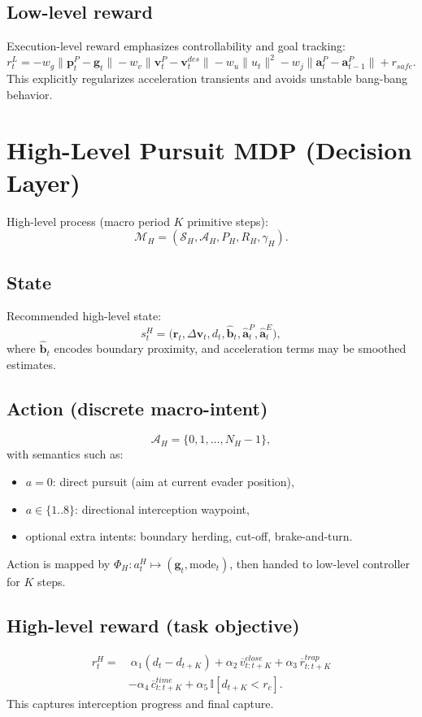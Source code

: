 \documentclass[11pt]{article}
\begin{document}
\subsection{Low-level reward}
Execution-level reward emphasizes controllability and goal tracking:
\begin{equation}
r_t^L = -w_g\|\bm{p}^P_t-\bm{g}_t\| - w_v\|\bm{v}^P_t-\bm{v}^{des}_t\| - w_u\|u_t\|^2
- w_j\|\bm{a}^P_t-\bm{a}^P_{t-1}\| + r_{safe}.
\end{equation}
This explicitly regularizes acceleration transients and avoids unstable bang-bang behavior.

\section{High-Level Pursuit MDP (Decision Layer)}

High-level process (macro period \(K\) primitive steps):
\[
\mathcal{M}_H=(\mathcal{S}_H,\mathcal{A}_H,P_H,R_H,\gamma_H).
\]

\subsection{State}
Recommended high-level state:
\begin{equation}
s_t^H = \big(\bm{r}_t,\Delta\bm{v}_t,d_t,\hat{\bm{b}}_t,\hat{\bm{a}}^P_t,\hat{\bm{a}}^E_t\big),
\end{equation}
where \(\hat{\bm{b}}_t\) encodes boundary proximity, and acceleration terms may be smoothed estimates.

\subsection{Action (discrete macro-intent)}
\begin{equation}
\mathcal{A}_H=\{0,1,\dots,N_H-1\},
\end{equation}
with semantics such as:
\begin{itemize}
  \item \(a=0\): direct pursuit (aim at current evader position),
  \item \(a\in\{1..8\}\): directional interception waypoint,
  \item optional extra intents: boundary herding, cut-off, brake-and-turn.
\end{itemize}
Action is mapped by
\(\Phi_H: a_t^H\mapsto (\bm{g}_t,\text{mode}_t)\), then handed to low-level controller for \(K\) steps.

\subsection{High-level reward (task objective)}
\begin{align}
r_t^H =&\ \alpha_1(d_{t}-d_{t+K}) + \alpha_2\,\overline v^{close}_{t:t+K}
+ \alpha_3\,\overline r^{trap}_{t:t+K} \\
&- \alpha_4\,\overline c^{time}_{t:t+K} + \alpha_5\,\mathbb{I}[d_{t+K}<r_c].
\end{align}
This captures interception progress and final capture.
\end{document}
